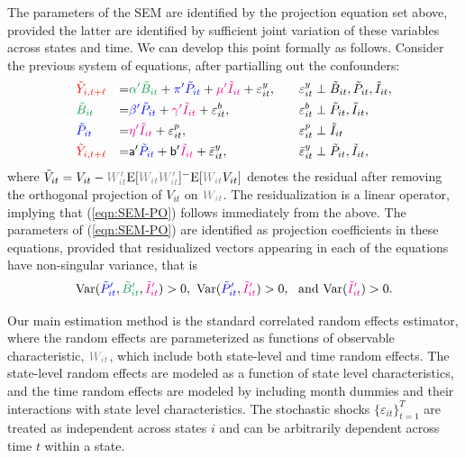 \documentclass[11pt,reqno,letter]{amsart}
\theoremstyle{definition}
\providecommand{\Var}{{\mathrm{Var}}}
\newcommand{\Ep}{{\mathrm{E}}}
\def\bcolor{\color{ForestGreen}}
\def\pcolor{\color{blue}}
\def\icolor{\color{magenta}}
\def\wcolor{\color{gray}}
\def\ycolor{\color{red}}
\begin{document}
The parameters of the SEM are identified by the projection equation set above, provided the latter are identified by sufficient joint variation of these variables across states and time. We can develop this point formally as follows. Consider the previous system of equations, after partialling out the confounders:
\begin{equation}\label{eqn:SEM-PO}
 \begin{aligned}
   & {\ycolor { \tilde Y_{i,t+\ell}}}  & =& {\bcolor {\alpha ' \tilde B_{it}}} +{\pcolor {\pi '\tilde P_{it}}} +{\icolor \mu'\tilde I_{it} } + \varepsilon^y_{it},&\varepsilon^y_{it} &\perp {\tilde B_{it}}, {\tilde  P_{it}}, { \tilde I_{it}},  \\
   & {\bcolor { \tilde B_{it}}} & = &{\pcolor { \beta' \tilde P_{it}} } + {\icolor { \gamma' \tilde I_{it}} } + \varepsilon^b_{it},
   &\quad \varepsilon^b_{it} &\perp { \tilde P_{it}}, { \tilde I_{it}},  \\
   & {\pcolor { \tilde P_{it}} } &= &  {\icolor {\eta' \tilde I_{it}} } +   \varepsilon^p_{it}, &\quad \varepsilon^p_{it} &\perp {\tilde I_{it}}  \\
     & {\ycolor { \tilde Y_{i,t+\ell}}}  & =&  \mathsf{a} ' {\pcolor {\tilde P_{it}}} + \mathsf{b}' {\icolor \tilde I_{it} } + \bar \varepsilon^y_{it},&\bar \varepsilon^y_{it} &\perp  {\tilde  P_{it}}, { \tilde I_{it}},  \\
   \end{aligned}
\end{equation}
where $ \tilde V_{it} = V_{it}   -     {\wcolor W_{it}'} \Ep[{\wcolor W_{it}W_{it}'}]^{-} \Ep[{\wcolor W_{it}} V_{it}]$ denotes
the residual after removing the orthogonal projection of $V_{it}$ on ${\wcolor W_{it}}$. The residualization is a linear operator, implying that (\ref{eqn:SEM-PO}) follows immediately from the above. The parameters of (\ref{eqn:SEM-PO})  are identified as projection coefficients in these equations, provided that residualized vectors appearing in each of the equations have non-singular variance, that is
 \begin{equation}
 \Var ( {\pcolor \tilde P_{it}'} ,{\bcolor \tilde B_{it}'},{\icolor \tilde I_{it}'})>0,
 \ \Var ({\pcolor \tilde P_{it}'}, {\icolor \tilde I_{it}'})> 0 , \ \text{ and  }  \Var ( {\icolor \tilde I_{it}'}) >0.
 \end{equation}

Our main estimation method is the standard correlated random effects estimator, where the random effects
are parameterized as functions of observable characteristic, ${\wcolor W_{it}}$, which include both state-level and time random effects.  The state-level random effects
are modeled as a function of state level characteristics, and the time random effects are modeled
by including month dummies and their interactions with state level characteristics.  The stochastic shocks $\{ \varepsilon_{it}\}_{t=1}^T$ are treated as independent across states $i$ and can be arbitrarily dependent across time $t$ within a state.
\end{document}
